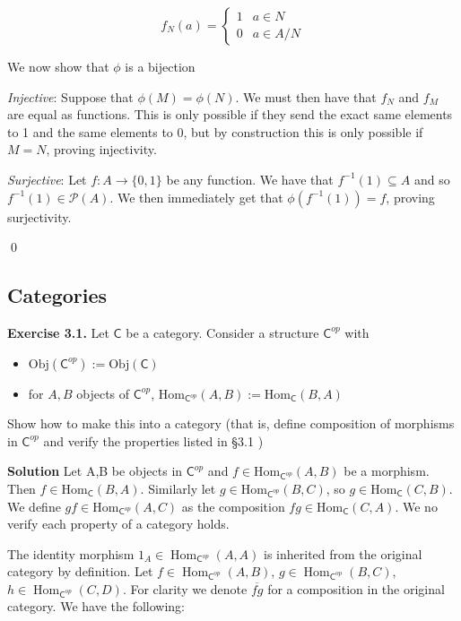 \documentclass[titlepage]{article}
\newcommand{\cat}[1]{\mathsf{#1}}
\newcommand{\Cat}{\cat{C}}
\DeclareMathOperator{\Hom}{Hom}
\begin{document}
\[ f_N(a) = \begin{cases}
    1 & a \in N \\ 0 & a \in A / N
\end{cases}
\]

We now show that $\phi$ is a bijection

\textit{Injective}: Suppose that $\phi(M)=\phi(N)$. We must then have that $f_N$ and $f_M$ are equal as functions. This is only possible if they send the exact same elements to 1 and the same elements to 0, but by construction this is only possible if $M=N$, proving injectivity.

\textit{Surjective}: Let $f:A \to \{0,1\}$ be any function. We have that $f^{-1}(1) \subseteq A$ and so $f^{-1}(1) \in \mathscr{P}(A)$. We then immediately get that $\phi(f^{-1}(1)) = f$, proving surjectivity.

\qed

\bigskip

\subsection{Categories}

\medskip

\textbf{Exercise 3.1.} Let $\mathsf{C}$ be a category. Consider a structure $\mathsf{C}^{op}$ with \begin{itemize}
    \item $\text{Obj}(\mathsf{C}^{op}) := \text{Obj}(\mathsf{C})$
    \item for $A,B$ objects of $\mathsf{C}^{op}$, $\text{Hom}_{\mathsf{C}^{op}}(A,B) := \text{Hom}_{\mathsf{C}}(B,A)$
\end{itemize}
Show how to make this into a category (that is, define composition of morphisms in $\mathsf{C}^{op}$ and verify the properties listed in \S 3.1 )

\medskip

\textbf{Solution} Let A,B be objects in $\mathsf{C}^{op}$ and $f \in \text{Hom}_{\mathsf{C}^{op}}(A,B)$ be a morphism. Then $f \in \text{Hom}_{\mathsf{C}}(B,A)$. Similarly let $g \in \text{Hom}_{\mathsf{C}^{op}}(B,C)$, so $g \in \text{Hom}_{\mathsf{C}}(C,B)$. We define $gf \in \text{Hom}_{\mathsf{C}^{op}}(A,C)$ as the composition $fg \in \text{Hom}_{\mathsf{C}}(C,A)$. We no verify each property of a category holds.

The identity morphism $1_A \in \Hom_{\Cat^{op}}(A,A)$ is inherited from the original category by definition. Let $f \in \Hom_{\Cat^{op}}(A,B)$, $g \in \Hom_{\Cat^{op}}(B,C)$, $h \in \Hom_{\Cat^{op}}(C,D)$. For clarity we denote $\overline{fg}$ for a composition in the original category. We have the following:
\end{document}
